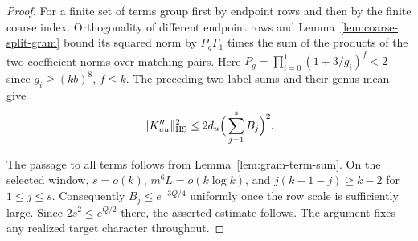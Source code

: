 \begin{proof}
For a finite set of terms group first by endpoint rows and then by the finite coarse index. Orthogonality of different endpoint rows and Lemma~\ref{lem:coarse-split-gram} bound its squared norm by \(P_g\Gamma_1\) times the sum of the products of the two coefficient norms over matching pairs. Here \(P_g=\prod_{i=0}^1(1+3/g_i)^f<2\) since \(g_i\ge(kb)^8\), \(f\le k\). The preceding two label sums and their genus mean give
\[
     \|K''_{uu}\|_{\rm HS}^2\le 2d_u\Big(\sum_{j=1}^s B_j\Big)^2 .
\]


The passage to all terms follows from Lemma~\ref{lem:gram-term-sum}. On the selected window, \(s=o(k)\), \(m^6L=o(k\log k)\), and \(j(k-1-j)\ge k-2\) for \(1\le j\le s\). Consequently \(B_j\le e^{-3Q/4}\) uniformly once the row scale is sufficiently large. Since \(2s^2\le e^{Q/2}\) there, the asserted estimate follows. The argument fixes any realized target character throughout.
\end{proof}
